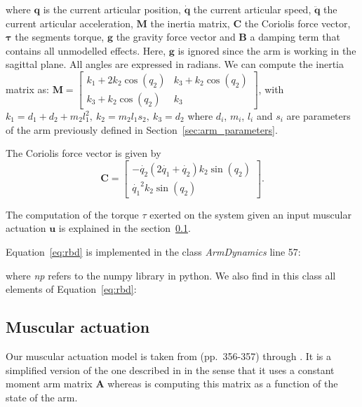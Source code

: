 \documentclass[pdftex,a4paper,12pt]{report}
\begin{document}
where $\textbf{q}$ is the current articular position, $\boldsymbol{\dot{q}}$ the current articular speed, $\boldsymbol{\ddot{q}}$ the current articular acceleration, $\textbf{M}$ the inertia matrix, $\textbf{C}$ the Coriolis force vector, $\boldsymbol{\tau}$ the segments torque, $\textbf{g}$ the gravity force vector and $\textbf{B}$ a damping term that contains all unmodelled effects.
Here, $\textbf{g}$ is ignored since the arm is working in the sagittal plane.
All angles are expressed in radians.
We can compute the inertia matrix as:
$
\textbf{M} = \begin{bmatrix}
           k_1 + 2 k_2 \cos(q_2)   &  k_3 + k_2 \cos(q_2) \\%
           k_3 + k_2 \cos(q_2)     &  k_3
          \end{bmatrix}
$, with $k_1 = d_1 + d_2 + m_2 l_1^2, ~ k_2 = m_2 l_1 s_2, ~ k_3 = d_2$ where $d_i$, $m_i$, $l_i$ and $s_i$ are parameters of the arm previously defined in Section~\ref{sec:arm_parameters}.

The Coriolis force vector is given by
$$
\textbf{C} = \begin{bmatrix}
           - \dot{q_2} (2 \dot{q_1} + \dot{q_2}) k_2 \sin(q_2)\\
            \dot{q_1}^2 k_2 \sin(q_2)
          \end{bmatrix}.
$$

The computation of the torque $\tau$ exerted on the system given an input muscular actuation $\textbf{u}$ is explained in the section~\ref{sec:muscular_actuation}.

Equation~\ref{eq:rbd} is implemented in the class \textit{ArmDynamics} line 57:

where \textit{np} refers to the numpy library in python.
We also find in this class all elements of Equation~\ref{eq:rbd}:


\subsection{Muscular actuation}
\label{sec:muscular_actuation}
Our muscular actuation model is taken from \cite{katayama93} (pp.~356-357) through \cite{mitrovic08_SAB}.
It is a simplified version of the one described in \cite{li2006} in the sense that it uses
a constant moment arm matrix $\textbf{A}$ whereas \cite{li2006} is computing this matrix as
a function of the state of the arm.
\end{document}
